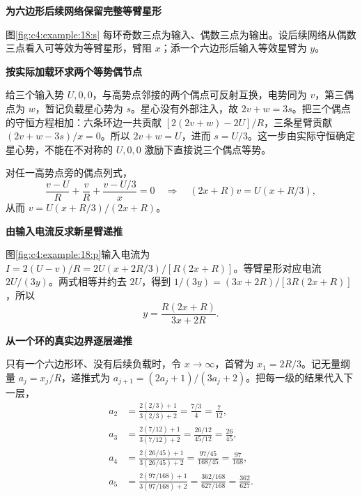 \begin{solution}\textbf{为六边形后续网络保留完整等臂星形}\par\nobreak
图\ref{fig:c4:example:18:s} 每环奇数三点为输入、偶数三点为输出。设后续网络从偶数三点看入可等效为等臂星形，臂阻 $x$；添一个六边形后输入等效星臂为 $y$。

\par\medskip{}\noindent\textbf{按实际加载环求两个等势偶节点}\par\nobreak
给三个输入势 $U,0,0$，与高势点邻接的两个偶点可反射互换，电势同为 $v$，第三偶点为 $w$，暂记负载星心势为 $s$。星心没有外部注入，故 $2v+w=3s$。把三个偶点的守恒方程相加：六条环边一共贡献 $[2(2v+w)-2U]/R$，三条星臂贡献 $(2v+w-3s)/x=0$。所以 $2v+w=U$，进而 $s=U/3$。这一步由实际守恒确定星心势，不能在不对称的 $U,0,0$ 激励下直接说三个偶点等势。

对任一高势点旁的偶点列式，
\[
 \frac{v-U}{R}+\frac vR+\frac{v-U/3}{x}=0
 \quad\Longrightarrow\quad(2x+R)v=U(x+R/3),
\]
从而 $v=U(x+R/3)/(2x+R)$。



\par\medskip{}\noindent\textbf{由输入电流反求新星臂递推}\par\nobreak
图\ref{fig:c4:example:18:p}输入电流为
$I=2(U-v)/R=2U(x+2R/3)/[R(2x+R)]$。等臂星形对应电流 $2U/(3y)$。两式相等并约去 $2U$，得到
$1/(3y)=(3x+2R)/[3R(2x+R)]$，所以
\[
 y=\frac{R(2x+R)}{3x+2R}.
\]


\par\medskip{}\noindent\textbf{从一个环的真实边界逐层递推}\par\nobreak
只有一个六边形环、没有后续负载时，令 $x\to\infty$，首臂为 $x_1=2R/3$。记无量纲量 $a_j=x_j/R$，递推式为 $a_{j+1}=(2a_j+1)/(3a_j+2)$。把每一级的结果代入下一层，
\[
 \begin{aligned}
 a_2&=\frac{2(2/3)+1}{3(2/3)+2}=\frac{7/3}{4}=\frac7{12},\\
 a_3&=\frac{2(7/12)+1}{3(7/12)+2}
 =\frac{26/12}{45/12}=\frac{26}{45},\\
 a_4&=\frac{2(26/45)+1}{3(26/45)+2}
 =\frac{97/45}{168/45}=\frac{97}{168},\\
 a_5&=\frac{2(97/168)+1}{3(97/168)+2}
 =\frac{362/168}{627/168}=\frac{362}{627}.
 \end{aligned}
\]



\end{solution}
